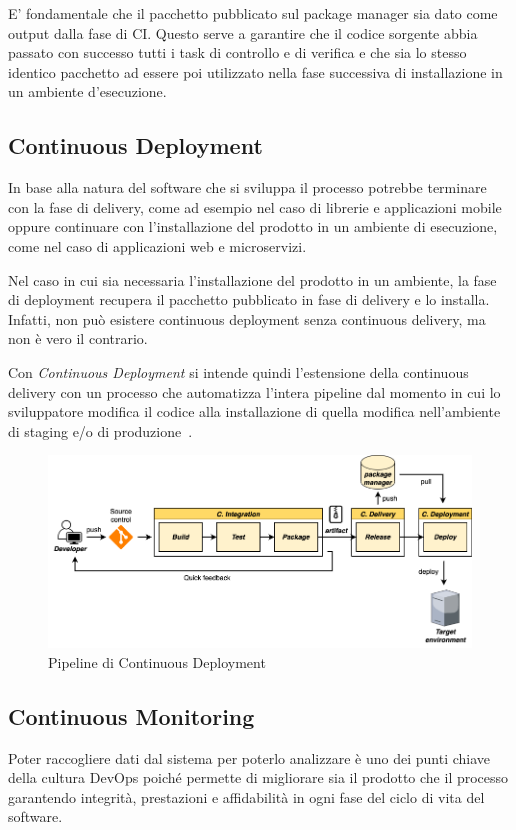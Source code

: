 E' fondamentale che il pacchetto pubblicato sul package manager sia dato come output dalla fase di CI. Questo serve a garantire che il codice sorgente abbia passato con successo tutti i task di controllo e di verifica e che sia lo stesso identico pacchetto ad essere poi utilizzato nella fase successiva di installazione in un ambiente d'esecuzione. 

\subsection{Continuous Deployment}
In base alla natura del software che si sviluppa il processo potrebbe terminare con la fase di delivery, come ad esempio nel caso di librerie e applicazioni mobile oppure continuare con l'installazione del prodotto in un ambiente di esecuzione, come nel caso di applicazioni web e microservizi. 

Nel caso in cui sia necessaria l'installazione del prodotto in un ambiente, la fase di deployment recupera il pacchetto pubblicato in fase di delivery e lo installa. Infatti, non può esistere continuous deployment senza continuous delivery, ma non è vero il contrario.

Con \textit{Continuous Deployment} si intende quindi l'estensione della continuous delivery con un processo che automatizza l'intera pipeline dal momento in cui lo sviluppatore modifica il codice alla installazione di quella modifica nell'ambiente di staging e/o di produzione~\cite{krief2019learning}.

\begin{figure}[H]
    \centering
    \includegraphics[width=1\textwidth]{img/cdeploy-pipeline.png}
    \caption{Pipeline di Continuous Deployment}
    \label{cdeploy-pipeline}
\end{figure}

\subsection{Continuous Monitoring}
Poter raccogliere dati dal sistema per poterlo analizzare è uno dei punti chiave della cultura DevOps poiché permette di migliorare sia il prodotto che il processo garantendo integrità, prestazioni e affidabilità in ogni fase del ciclo di vita del software.

